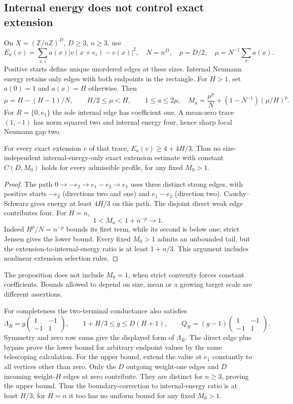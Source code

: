 \subsection{Internal energy does not control exact extension}
On $X=(\mathbb Z/n\mathbb Z)^D$, $D\ge3$, $n\ge3$, use
\[
 E_a(v)=\sum_{x,i}a(x)|v(x+e_i)-v(x)|^2,\quad N=n^D,\quad p=D/2,
 \quad \mu=N^{-1}\sum_xa(x).
\]
Positive starts define unique unordered edges at these sizes. Internal
Neumann energy retains only edges with both endpoints in the rectangle.
For $H>1$, set $a(0)=1$ and $a(x)=H$ otherwise. Then
\[
 \mu=H-(H-1)/N,\qquad H/2\le\mu<H,\qquad 1\le a\le2\mu,
 \quad M_a=\frac{\mu^p}{N}+(1-N^{-1})(\mu/H)^p.
\]
For $R=\{0,e_1\}$ the sole internal edge has coefficient one. A mean-zero
trace $(1,-1)$ has norm squared two and internal energy four, hence sharp
local Neumann gap two.
\begin{proposition}\label{prop:boundary195-single}
For every exact extension $v$ of that trace,
$E_a(v)\ge4+4H/3$. Thus no size-independent internal-energy-only exact
extension estimate with constant $C(D,M_0)$ holds for every admissible
profile, for any fixed $M_0>1$.
\end{proposition}
\begin{proof}
The path $0\to-e_2\to e_1-e_2\to e_1$ uses three distinct strong edges,
with positive starts $-e_2$ (directions two and one) and $e_1-e_2$
(direction two). Cauchy--Schwarz gives energy at least $4H/3$ on this
path. The disjoint direct weak edge contributes four. For $H=n$,
\[
 1<M_a<1+n^{-p}\longrightarrow1.
\]
Indeed $H^p/N=n^{-p}$ bounds its first term, while its second is below
one; strict Jensen gives the lower bound. Every fixed $M_0>1$ admits
an unbounded tail, but the extension-to-internal-energy ratio is at least
$1+n/3$. This argument includes nonlinear extension selection rules.
\end{proof}
The proposition does not include $M_0=1$, when strict convexity forces
constant coefficients. Bounds allowed to depend on size, mean or a growing
target scale are different assertions.

For completeness the two-terminal conductance also satisfies
\[
 \Lambda_R=g\begin{pmatrix}1&-1\\-1&1\end{pmatrix},\qquad
 1+H/3\le g\le D(H+1),\qquad
 Q_R=(g-1)\begin{pmatrix}1&-1\\-1&1\end{pmatrix}.
\]
Symmetry and zero row sums give the displayed form of $\Lambda_R$.
The direct edge plus bypass prove the lower bound for arbitrary endpoint
values by the same telescoping calculation. For the upper bound, extend
the value at $e_1$ constantly to all vertices other than zero. Only the
$D$ outgoing weight-one edges and $D$ incoming weight-$H$ edges at zero
contribute. They are distinct for $n\ge3$, proving the upper bound.
Thus the boundary-correction to internal-energy ratio is at least $H/3$;
for $H=n$ it too has no uniform bound for any fixed $M_0>1$.

